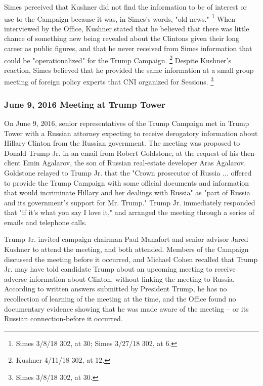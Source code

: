 Simes perceived that Kushner did not find the information to be of interest or use to the Campaign because it was, in Simes's words, "old news."%
\footnote{Simes 3/8/18 302, at 30;
Simes 3/27/18 302, at 6.}
When interviewed by the Office, Kushner stated that he believed that there was little chance of something new being revealed about the Clintons given their long career as public figures, and that he never received from Simes information that could be "operationalized" for the Trump Campaign.%
\footnote{Kushner 4/11/18 302, at 12.}
Despite Kushner's reaction, Simes believed that he provided the same information at a small group meeting of foreign policy experts that CNI organized for Sessions.%
\footnote{Simes 3/8/18 302, at 30.}

\subsubsection{June 9, 2016 Meeting at Trump Tower}

On June 9, 2016, senior representatives of the Trump Campaign met in Trump Tower with a Russian attorney expecting to receive derogatory information about Hillary Clinton from the Russian government.
The meeting was proposed to Donald Trump Jr. in an email from Robert Goldstone, at the request of his then-client Emin Agalarov, the son of Russian real-estate developer Aras Agalarov.
Goldstone relayed to Trump Jr. that the "Crown prosecutor of Russia ... offered to provide the Trump Campaign with some official documents and information that would incriminate Hillary and her dealings with Russia" as "part of Russia and its government's support for Mr. Trump."
Trump Jr. immediately responded that "if it's what you say I love it," and arranged the meeting through a series of emails and telephone calls.

Trump Jr. invited campaign chairman Paul Manafort and senior advisor Jared Kushner to attend the meeting, and both attended.
Members of the Campaign discussed the meeting before it occurred, and Michael Cohen recalled that Trump Jr. may have told candidate Trump about an upcoming meeting to receive adverse information about Clinton, without linking the meeting to Russia.
According to written answers submitted by President Trump, he has no recollection of learning of the meeting at the time, and the Office found no documentary evidence showing that he was made aware of the meeting -- or its Russian connection-before it occurred.


